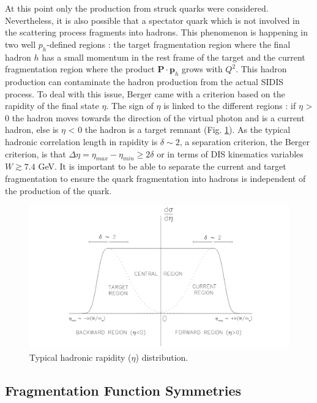 At this point only the production from struck quarks were considered. Nevertheless, it is also possible that a spectator quark which is not involved in the scattering process fragments into hadrons. This phenomenon is happening in two well $p_h$-defined regions : the target fragmentation region where the final hadron $h$ has a small momentum in the rest frame of the target and the current fragmentation region where the product $\textbf{P}\cdot\textbf{p}_h$ grows with $Q^2$. This hadron production can contaminate the hadron production from the actual SIDIS process. To deal with this issue, Berger \cite{BERGER} came with a criterion based on the rapidity of the final state $\eta$. The sign of $\eta$ is linked to the different regions : if $\eta$ > 0 the hadron moves towards the direction of the virtual photon and is a current hadron, else is $\eta$ < 0 the hadron is a target remnant (Fig. \ref{pic:Berger}). As the typical hadronic correlation length in rapidity is $\delta \sim 2$, a separation criterion, the Berger criterion, is that $\Delta\eta = \eta_{max}-\eta_{min} \geq 2\delta$ or in terms of DIS kinematics variables $W \gtrsim 7.4$ GeV. It is important to be able to separate the current and target fragmentation to ensure the quark fragmentation into hadrons is independent of the production of the quark.

\begin{figure}[!h]
  \centering
	\includegraphics[scale=0.5]{./gfx/Berger.png}
	\caption{Typical hadronic rapidity ($\eta$) distribution.}
	\label{pic:Berger}
\end{figure}

\subsection{Fragmentation Function Symmetries}

